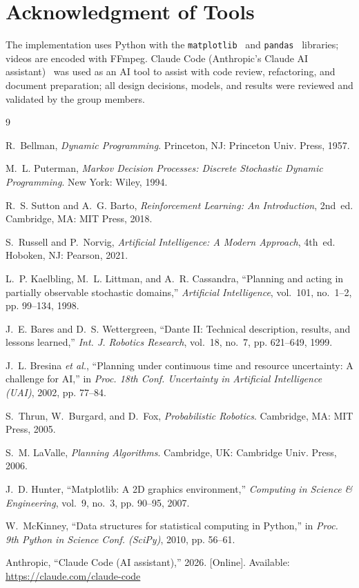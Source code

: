 \documentclass[conference]{IEEEtran}
\begin{document}
\section*{Acknowledgment of Tools}

The implementation uses Python with the \texttt{matplotlib}~\cite{hunter2007} and \texttt{pandas}~\cite{mckinney2010} libraries; videos are encoded with FFmpeg. Claude Code (Anthropic's Claude AI assistant)~\cite{claude} was used as an AI tool to assist with code review, refactoring, and document preparation; all design decisions, models, and results were reviewed and validated by the group members.

\begin{thebibliography}{9}

 R.~Bellman, \emph{Dynamic Programming}. Princeton, NJ: Princeton Univ. Press, 1957.

 M.~L. Puterman, \emph{Markov Decision Processes: Discrete Stochastic Dynamic Programming}. New York: Wiley, 1994.

 R.~S. Sutton and A.~G. Barto, \emph{Reinforcement Learning: An Introduction}, 2nd~ed. Cambridge, MA: MIT Press, 2018.

 S.~Russell and P.~Norvig, \emph{Artificial Intelligence: A Modern Approach}, 4th~ed. Hoboken, NJ: Pearson, 2021.

 L.~P. Kaelbling, M.~L. Littman, and A.~R. Cassandra, ``Planning and acting in partially observable stochastic domains,'' \emph{Artificial Intelligence}, vol.~101, no.~1--2, pp. 99--134, 1998.

 J.~E. Bares and D.~S. Wettergreen, ``Dante II: Technical description, results, and lessons learned,'' \emph{Int. J. Robotics Research}, vol.~18, no.~7, pp. 621--649, 1999.

 J.~L. Bresina \emph{et al.}, ``Planning under continuous time and resource uncertainty: A challenge for AI,'' in \emph{Proc. 18th Conf. Uncertainty in Artificial Intelligence (UAI)}, 2002, pp. 77--84.

 S.~Thrun, W.~Burgard, and D.~Fox, \emph{Probabilistic Robotics}. Cambridge, MA: MIT Press, 2005.

 S.~M. LaValle, \emph{Planning Algorithms}. Cambridge, UK: Cambridge Univ. Press, 2006.

 J.~D. Hunter, ``Matplotlib: A 2D graphics environment,'' \emph{Computing in Science \& Engineering}, vol.~9, no.~3, pp. 90--95, 2007.

 W.~McKinney, ``Data structures for statistical computing in Python,'' in \emph{Proc. 9th Python in Science Conf. (SciPy)}, 2010, pp. 56--61.

 Anthropic, ``Claude Code (AI assistant),'' 2026. [Online]. Available: \url{https://claude.com/claude-code}

\end{thebibliography}
\end{document}
